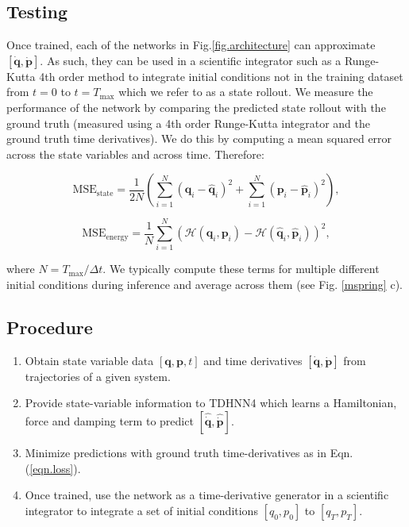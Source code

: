 \documentclass{article}
\begin{document}
\subsection*{Testing}
Once trained, each of the networks in Fig.\ref{fig.architecture} can approximate $[\dot{\mathbf{q}},\dot{\mathbf{p}}]$. As such, they can be used in a scientific integrator such as a Runge-Kutta 4th order method to integrate initial conditions not in the training dataset from $t=0$ to $t=T_{\max}$ which we refer to as a state rollout. We measure the performance of the network by comparing the predicted state rollout with the ground truth (measured using a 4th order Runge-Kutta integrator and the ground truth time derivatives). We do this by computing a mean squared error across the state variables and across time. Therefore:

\begin{equation}
\mathrm{MSE}_{\mathrm{state}} = \frac{1}{2N} \left(\sum_{i=1}^N (\mathbf{q}_i-\hat{\mathbf{q}}_i)^2 + \sum_{i=1}^N (\mathbf{p}_i - \hat{\mathbf{p}}_i)^2\right),
\end{equation}

\begin{equation}
\mathrm{MSE}_{\mathrm{energy}} = \frac{1}{N} \sum_{i=1}^N \left(\mathcal{H}(\mathbf{q}_i,\mathbf{p}_i)-\mathcal{H}(\hat{\mathbf{q}}_i,\hat{\mathbf{p}}_i)\right)^2,
\end{equation}

where $N = T_{\max}/\Delta t $. We typically compute these terms for multiple different initial conditions during inference and average across them (see Fig. \ref{mspring} c).



\subsection*{Procedure}

\begin{enumerate}
\item Obtain state variable data $[\mathbf{q},\mathbf{p},t]$ and time derivatives $[\dot{\mathbf{q}},\dot{\mathbf{p}}]$ from trajectories of a given system.
\item Provide state-variable information to TDHNN4 which learns a Hamiltonian, force and damping term to predict $[\hat{\dot{\mathbf{q}}},\hat{\dot{\mathbf{p}}}]$.
\item Minimize predictions with ground truth time-derivatives as in Eqn.(\ref{eqn.loss}).
\item Once trained, use the network as a time-derivative generator in a scientific integrator to integrate a set of initial conditions $[q_0,p_0]$ to $[q_T,p_T]$.
\end{enumerate}
\end{document}
